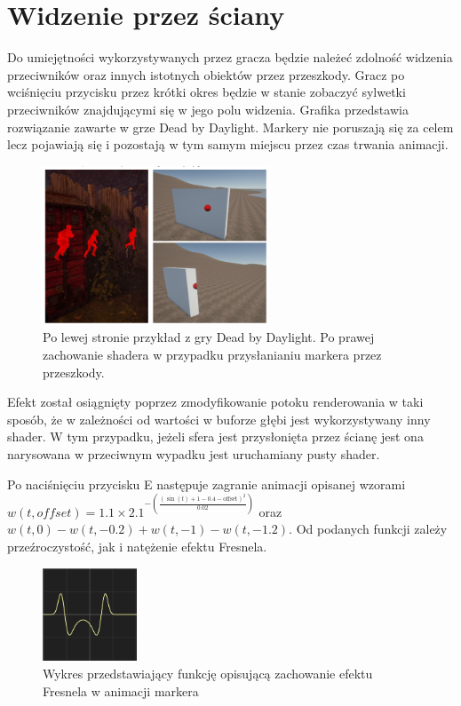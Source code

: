 \chapter{Widzenie przez ściany}

Do umiejętności wykorzystywanych przez gracza będzie należeć zdolność widzenia przeciwników oraz innych istotnych obiektów przez przeszkody.
Gracz po wciśnięciu przycisku przez krótki okres będzie w stanie zobaczyć sylwetki przeciwników znajdującymi się w jego polu widzenia.
Grafika przedstawia rozwiązanie zawarte w grze Dead by Daylight. Markery nie poruszają się za celem lecz pojawiają się i pozostają w tym samym miejscu przez czas trwania animacji.

\begin{figure}[h]
\centering
\includegraphics[width=0.6\textwidth]{images/shader}
\caption{Po lewej stronie przykład z gry Dead by Daylight. Po prawej zachowanie shadera w przypadku przysłanianiu markera przez przeszkody.}
\end{figure}

Efekt został osiągnięty poprzez zmodyfikowanie potoku renderowania w taki sposób, że w zależności od wartości w buforze głębi jest wykorzystywany inny shader.
W tym przypadku, jeżeli sfera jest przysłonięta przez ścianę jest ona narysowana w przeciwnym wypadku jest uruchamiany pusty shader.

Po naciśnięciu przycisku E następuje zagranie animacji opisanej wzorami $ w(t, offset) = 1.1 \times 2.1^{-\left(\frac{{\left(\sin(t) + 1 - 0.4 - \text{{offset}}\right)^2}}{{0.02}}\right)} $
oraz $ w(t, 0) - w(t, -0.2) + w(t, -1) - w(t, -1.2) $. Od podanych funkcji zależy przeźroczystość, jak i natężenie efektu Fresnela. 

\begin{figure}[h]
    \centering
    \includegraphics[width=0.25\textwidth]{images/g}
    \caption{Wykres przedstawiający funkcję opisującą zachowanie efektu Fresnela w animacji markera}
\end{figure}



